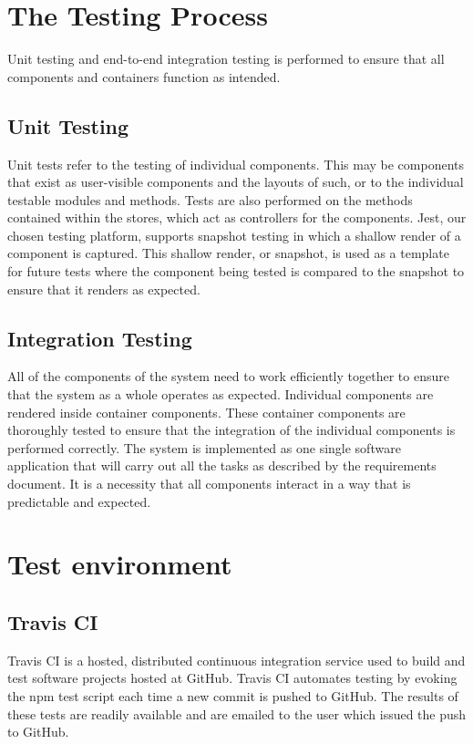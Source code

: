 \documentclass[a4paper]{article}
\begin{document}
\section{The Testing Process}
Unit testing and end-to-end integration testing is performed to ensure that all components and containers function as intended.
    	\subsection{Unit Testing}
        Unit tests refer to the testing of individual components. This may be components that exist as user-visible components and the layouts of such, or to the individual testable modules and methods. Tests are also performed on the methods contained within the stores, which act as controllers for the components. Jest, our chosen testing platform, supports snapshot testing in which a shallow render of a component is captured. This shallow render, or snapshot, is used as a template for future tests where the component being tested is compared to the snapshot to ensure that it renders as expected.
        
        \subsection{Integration Testing}
        All of the components of the system need to work efficiently together to ensure that the system as a whole operates as expected. Individual components are rendered inside container components. These container components are thoroughly tested to ensure that the integration of the individual components is performed correctly. The system is implemented as one single software application that will carry out all the tasks as described by the requirements document. It is a necessity that all components interact in a way that is predictable and expected.
        
    \newline
  	\newline
    
\section{Test environment}
	\subsection{Travis CI}
Travis CI is a hosted, distributed continuous integration service used to build and test software projects hosted at GitHub. Travis CI automates testing by evoking the npm test script each time a new commit is pushed to GitHub. The results of these tests are readily available and are emailed to the user which issued the push to GitHub.
\end{document}

